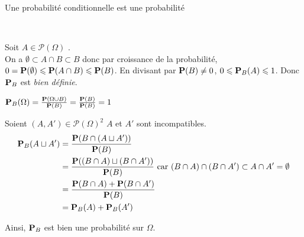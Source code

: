 \documentclass{article}
\renewenvironment{question_kholle}[2][ ]
{
	\subsection{\texorpdfstring{#2}{}}
	\notblank{#1}
	{
		\noindent #1
		\bigbreak
	}
	{}
	\begin{proof}
}
{
	\end{proof}
}
\begin{document}
	{Une probabilité conditionnelle est une probabilité}
	
	~\\
	\begin{liste}
		\item Soit $A \in \mathcal{P}(\Omega)$ \fq. \\
		On a $\emptyset \subset A \cap B  \subset B$ donc par croissance de la probabilité, $0 = \mathbf P(\emptyset) \leqslant \mathbf P(A \cap B) \leqslant \mathbf P(B)$.
		En divisant par $\mathbf P(B) \neq 0$, $0 \leqslant \mathbf P_B(A) \leqslant 1$. Donc $\mathbf P_B$ est \textit{bien définie}.
		\item $\mathbf P_B(\Omega)
		= \frac{\mathbf P(\Omega \cup B)}{\mathbf P(B)}
		= \frac{\mathbf P(B)}{\mathbf P(B)}
		= 1$
		\item Soient $(A, A') \in \mathcal{P}(\Omega)^2$ \fq* \tq* $A$ et $A'$ sont incompatibles.
		\begin{equation}
			\begin{aligned}
				\mathbf P_B(A \sqcup A')
				&= \frac{ \mathbf P(B \cap (A \sqcup A') ) }{ \mathbf P(B) } \\
				&= \frac{ \mathbf P( (B \cap A) \sqcup (B \cap A') ) }{ \mathbf P(B) } \text{ car } (B \cap A) \cap (B \cap A') \subset A \cap A' = \emptyset \\
				&= \frac{ \mathbf P(B \cap A) + \mathbf P(B \cap A') }{ \mathbf P(B) } \\
				&= \mathbf P_B(A) + \mathbf P_B(A')
			\end{aligned}
		\end{equation}
	\end{liste}
	Ainsi, $\mathbf P_B$ est bien une probabilité sur $\Omega$.
\end{question_kholle}
\end{document}
